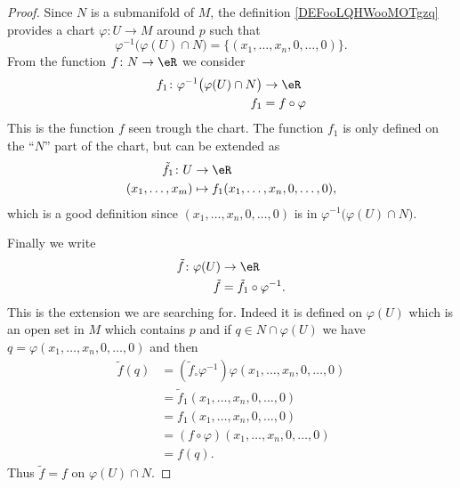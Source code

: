 \begin{proof}
	Since \( N\) is a submanifold of \( M\), the definition \ref{DEFooLQHWooMOTgzq} provides a chart \( \varphi\colon U\to M\) around \( p\) such that
	\begin{equation}
		\varphi^{-1}\big( \varphi(U)\cap N \big)=\{ (x_1,\ldots, x_n,0,\ldots, 0) \}.
	\end{equation}
	From the function \( f\colon N\to \eR\) we consider
	\begin{equation}
		\begin{aligned}
			f_1\colon \varphi^{-1}\big( \varphi(U)\cap N \big) & \to \eR        \\
			f_1                                                & =f\circ\varphi
		\end{aligned}
	\end{equation}
	This is the function \( f\) seen trough the chart. The function \( f_1\) is only defined on the ``\( N\)'' part of the chart, but can be extended as
	\begin{equation}
		\begin{aligned}
			\tilde f_1\colon U & \to \eR                                   \\
			(x_1,\ldots, x_m)  & \mapsto f_1(x_1,\ldots, x_n,0,\ldots, 0),
		\end{aligned}
	\end{equation}
	which is a good definition since \( (x_1,\ldots, x_n,0,\ldots, 0)\) is in \( \varphi^{-1}\big( \varphi(U)\cap N \big)\).

	Finally we write
	\begin{equation}
		\begin{aligned}
			\tilde f\colon \varphi(U) & \to \eR                       \\
			\tilde f                  & =\tilde f_1\circ\varphi^{-1}.
		\end{aligned}
	\end{equation}
	This is the extension we are searching for. Indeed it is defined on \( \varphi(U)\) which is an open set in \( M\) which contains \( p\) and if \( q\in N\cap\varphi(U)\) we have \( q=\varphi(x_1,\ldots, x_n,0,\ldots, 0)\) and then
	\begin{subequations}
		\begin{align}
			\tilde f(q) & =(\tilde f_\circ\varphi^{-1})\varphi(x_1,\ldots, x_n,0,\ldots, 0) \\
			            & =\tilde f_1(x_1,\ldots, x_n,0,\ldots, 0)                          \\
			            & =f_1(x_1,\ldots, x_n,0,\ldots, 0)                                 \\
			            & =(f\circ\varphi)(x_1,\ldots, x_n,0,\ldots, 0)                     \\
			            & =f(q).
		\end{align}
	\end{subequations}
	Thus \( \tilde f=f\) on \( \varphi(U)\cap N\).
\end{proof}

